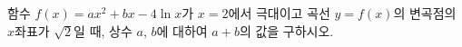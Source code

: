 함수 $f(x)=ax^2+bx-4\ln x$가 $x=2$에서 극대이고 곡선 $y=f(x)$의 변곡점의 $x$좌표가 $\sqrt{2}$일 때, 상수 $a$, $b$에 대하여 $a+b$의 값을 구하시오.
